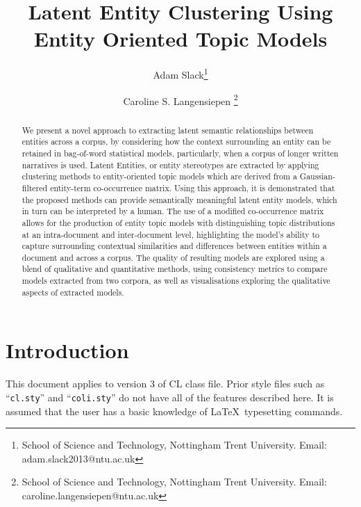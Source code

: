 \documentclass{clv3}
\begin{document}
\title{Latent Entity Clustering Using Entity Oriented Topic Models}

\author{Adam Slack\thanks{School of Science and Technology, Nottingham Trent University. Email: adam.slack2013@ntu.ac.uk}}

\author{Caroline S. Langensiepen \thanks{School of Science and Technology, Nottingham Trent University. Email: caroline.langensiepen@ntu.ac.uk}}


\maketitle

\begin{abstract}
  We present a novel approach to extracting latent semantic relationships between entities across a
  corpus, by considering how the context surrounding an entity can be retained in bag-of-word statistical
  models, particularly, when a corpus of longer written narratives is used. Latent Entities, or
  entity stereotypes are extracted by applying clustering methods to entity-oriented topic models 
  which are derived from a Gaussian-filtered entity-term co-occurrence matrix. Using this approach, it
  is demonstrated that the proposed methods can provide semantically meaningful latent entity models,
  which in turn can be interpreted by a human. The use of a modified co-occurrence matrix allows for
  the production of entity topic models with distinguishing topic distributions at an intra-document
  and inter-document level, highlighting the model's ability  to capture surrounding contextual
  similarities and differences between entities within a document and across a corpus. The quality
  of resulting models are explored using a blend of qualitative and quantitative methods, using
  consistency metrics to compare models extracted from two corpora, as well as visualisations
  exploring the qualitative aspects of extracted models. 
\end{abstract}

\section{Introduction}

This document applies to version 3 of CL class file. Prior style files such as 
``{\tt cl.sty}'' and ``{\tt coli.sty}'' do not have all of the features 
described here. It is assumed that the user has a basic knowledge of \LaTeX\ 
typesetting commands.
\end{document}
